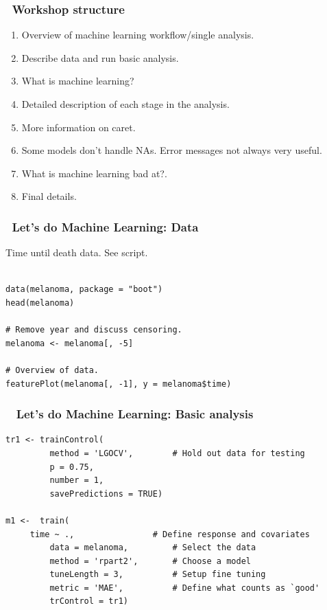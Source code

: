 \documentclass[handout, aspectratio = 169]{beamer}
\begin{document}
\begin{frame}
\frametitle{\insertframenumber~Workshop structure}
\begin{enumerate}
\item Overview of machine learning workflow/single analysis.
\item Describe data and run basic analysis.
\item What is machine learning?
\item Detailed description of each stage in the analysis.
\item More information on caret.
\item Some models don't handle NAs. Error messages not always very useful.
\item What is machine learning bad at?.
\item Final details.
\end{enumerate}

\end{frame} 



\begin{frame}[fragile]
\frametitle{\insertframenumber~Let's do Machine Learning: Data}
Time until death data. See script.
\begin{Verbatim}

data(melanoma, package = "boot")
head(melanoma)

# Remove year and discuss censoring.
melanoma <- melanoma[, -5]

# Overview of data.
featurePlot(melanoma[, -1], y = melanoma$time)

\end{Verbatim}

\end{frame} 




\begin{frame}[fragile]
\frametitle{\insertframenumber~ Let's do Machine Learning: Basic analysis}

\vspace{2mm}
\begin{Verbatim}
tr1 <- trainControl(
         method = 'LGOCV',        # Hold out data for testing
         p = 0.75,
         number = 1,
         savePredictions = TRUE)

m1 <-  train(
	 time ~ .,                # Define response and covariates
         data = melanoma,         # Select the data
         method = 'rpart2',       # Choose a model
         tuneLength = 3,          # Setup fine tuning
         metric = 'MAE',          # Define what counts as `good'
         trControl = tr1)

\end{Verbatim}

\end{frame} 
\end{document}
